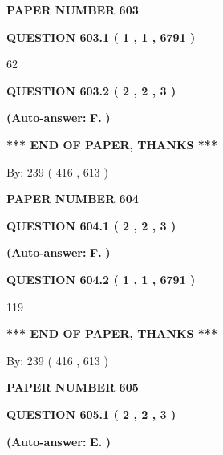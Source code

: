 \documentclass{ctexart}
\begin{document}
   
\newpage 
\setcounter{page}{ 
   603001 } 
   
   
 {\textbf{ \Large{ PAPER NUMBER  603  }}}
   
   
   
   
  
  
{\textbf{\large{QUESTION
603.1 
 ( 1 , 1 , 6791 )
}}}

62
  
  
{\textbf{\large{QUESTION
603.2 
 ( 2 , 2 , 3 )
}}}
 
 
{\textbf{(Auto-answer:}}
{\textbf{\large{
F.}}}
{\textbf{)}}
 
 
   
   
   
   
\vspace{1.0in} 
{\textbf{\large{ *** END OF PAPER, THANKS *** }}} 
   
   
\hspace{1.0in} By: 
 239 ( 416 ,  613 )
   
   
   
   
\newpage 
\setcounter{page}{ 
   604001 } 
   
   
 {\textbf{ \Large{ PAPER NUMBER  604  }}}
   
   
   
   
  
  
{\textbf{\large{QUESTION
604.1 
 ( 2 , 2 , 3 )
}}}
 
 
{\textbf{(Auto-answer:}}
{\textbf{\large{
F.}}}
{\textbf{)}}
 
 
  
  
{\textbf{\large{QUESTION
604.2 
 ( 1 , 1 , 6791 )
}}}

119
   
   
   
   
\vspace{1.0in} 
{\textbf{\large{ *** END OF PAPER, THANKS *** }}} 
   
   
\hspace{1.0in} By: 
 239 ( 416 ,  613 )
   
   
   
   
\newpage 
\setcounter{page}{ 
   605001 } 
   
   
 {\textbf{ \Large{ PAPER NUMBER  605  }}}
   
   
   
   
  
  
{\textbf{\large{QUESTION
605.1 
 ( 2 , 2 , 3 )
}}}
 
 
{\textbf{(Auto-answer:}}
{\textbf{\large{
E.}}}
{\textbf{)}}
 
 
  
\end{document}
